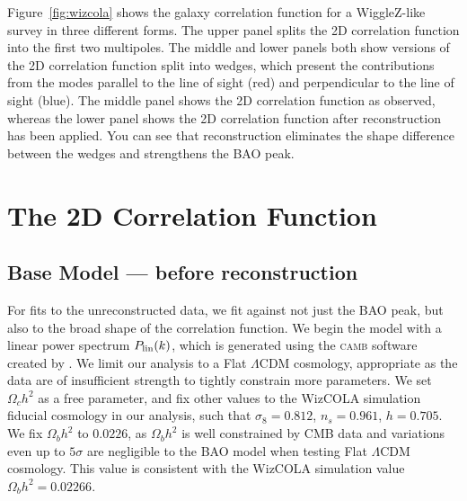 \documentclass[iop,twocolappendix]{emulateapj}
\newcommand{\camb}{\textsc{camb}}
\begin{document}
Figure~\ref{fig:wizcola} shows the galaxy correlation function for a WiggleZ-like survey in three different forms.  The upper panel splits the 2D correlation function into the first two multipoles.  The middle and lower panels both show versions of the 2D correlation function split into wedges, which present the contributions from the modes parallel to the line of sight (red) and perpendicular to the line of sight (blue).  The middle panel shows the 2D correlation function as observed, whereas the lower panel shows the 2D correlation function after reconstruction has been applied.  You can see that reconstruction eliminates the shape difference between the wedges and strengthens the BAO peak. 






\section{The 2D Correlation Function}
\label{sec:model}

\subsection{Base Model --- before reconstruction}
For fits to the unreconstructed data, we fit against not just the BAO peak, but also to the broad shape of the correlation function. We begin the model with a linear power spectrum $P_{\rm{lin}}(k)$, which is  generated using the \camb{} software created by \citet{Lewis2000}. We limit our analysis to a Flat $\Lambda$CDM cosmology, appropriate as the data are of insufficient strength to tightly constrain more parameters.
We set $\Omega_c h^2$ as a free parameter, and fix other values to the WizCOLA simulation fiducial cosmology in our analysis, such that $\sigma_8 = 0.812$, $n_s=0.961$, $h = 0.705$. We fix $\Omega_b h^2$ to $0.0226$, as $\Omega_b h^2$ is well constrained by CMB data and variations even up to $5\sigma$ are negligible to the BAO model when testing Flat $\Lambda$CDM cosmology. This value is consistent with the WizCOLA simulation value $\Omega_b h^2 = 0.02266$. 
\end{document}
